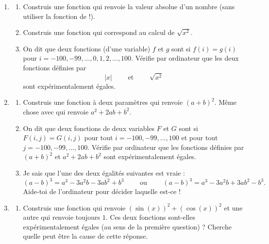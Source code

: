 \documentclass[11pt,class=report,crop=false]{standalone}
\begin{document}
\begin{activite}


\begin{enumerate}
  \item
  \begin{enumerate}
    \item Construis une fonction  qui renvoie la valeur absolue d'un nombre (sans utiliser la fonction  de \Python{} !). 
    \item Construis une fonction  qui correspond au calcul de $\sqrt{x^2}$.

  
  \item On dit que deux fonctions (d'une variable) $f$ et $g$ sont  si $f(i)=g(i)$ pour $i=-100,-99,\ldots,0,1,2,\ldots,100$. Vérifie par ordinateur que les deux fonctions définies par
  $$|x| \qquad \text{ et } \qquad \sqrt{x^2}$$
  sont expérimentalement égales. 
  
  \end{enumerate}
  
  \item
    \begin{enumerate}
    \item Construis une fonction à deux paramètres  qui renvoie $(a+b)^2$. Même chose avec  qui renvoie $a^2+2ab+b^2$.

  
  \item On dit que deux fonctions de deux variables $F$ et $G$ sont  si $F(i,j)=G(i,j)$ pour tout $i=-100,-99,\ldots,100$ et pour tout $j = -100,-99,\ldots,100$. Vérifie par ordinateur que les fonctions définies par $(a+b)^2$ et $a^2+2ab+b^2$ sont expérimentalement égales. 
  
   \item Je sais que l'une des deux égalités suivantes est vraie :
   $$(a-b)^3 = a^3 - 3a^2b -3ab^2+b^3 \qquad \text{ ou } \qquad (a-b)^3 = a^3 - 3a^2b  + 3ab^2 - b^3.$$
   Aide-toi de l'ordinateur pour décider laquelle est-ce !
   
  \end{enumerate} 
  
  \item 
   \begin{enumerate}
    \item Construis une fonction  qui renvoie $(\sin(x))^2 + (\cos(x))^2$ et une autre  qui renvoie toujours $1$. Ces deux fonctions sont-elles expérimentalement égales (au sens de la première question) ? Cherche quelle peut être la cause de cette réponse.
    

\end{enumerate}
\end{enumerate}
\end{activite}
\end{document}
